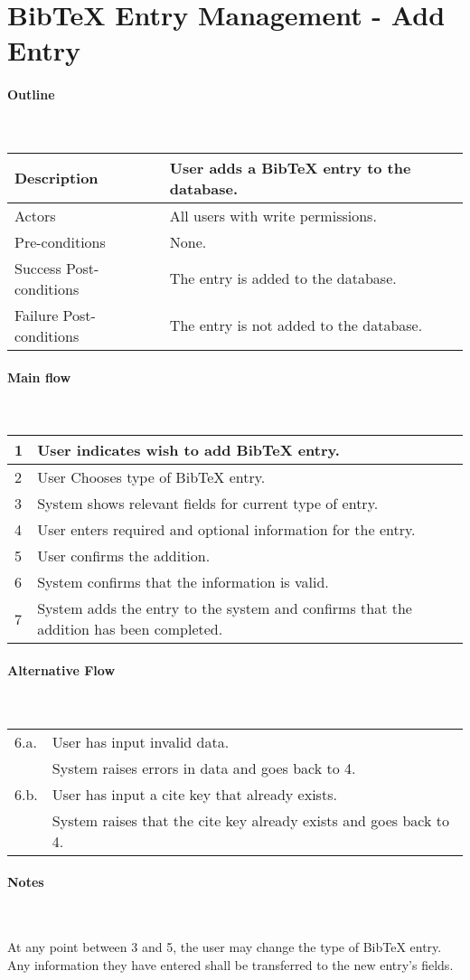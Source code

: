\section*{BibTeX Entry Management - Add Entry} %

\paragraph*{Outline} \

\begin{tabular}{ | l | l | }
\hline
Description & User adds a BibTeX entry to the database. \\ \hline
Actors & All users with write permissions. \\ \hline
Pre-conditions & None. \\ \hline
Success Post-conditions & The entry is added to the database. \\ \hline
Failure Post-conditions & The entry is not added to the database. \\ \hline
\end{tabular}


\paragraph*{Main flow} \

\begin{tabular}{ | l | l | } \hline
1 & User indicates wish to add BibTeX entry. \\ \hline
2 & User Chooses type of BibTeX entry. \\ \hline
3 & System shows relevant fields for current type of entry. \\ \hline
4 & User enters required and optional information for the entry. \\ \hline
5 & User confirms the addition. \\ \hline
6 & System confirms that the information is valid. \\ \hline
7 & System adds the entry to the system and confirms that the addition has been completed. \\ \hline
\end{tabular}


\paragraph*{Alternative Flow} \

\begin{tabular}{ | l | l | } \hline
6.a. & User has input invalid data. \\
     & System raises errors in data and goes back to 4. \\ \hline
6.b. & User has input a cite key that already exists. \\
     & System raises that the cite key already exists and goes back to 4. \\ \hline
\end{tabular}

\paragraph*{Notes} \

At any point between 3 and 5, the user may change the type of BibTeX entry. Any information they have entered shall be transferred to the new entry's fields.

